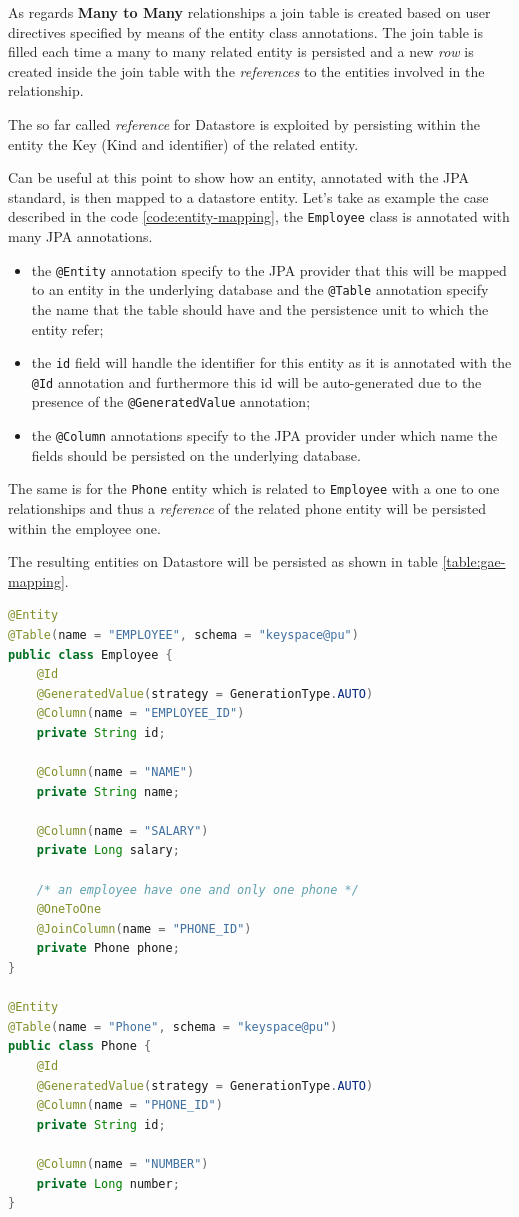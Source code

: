 \noindent As regards \textbf{Many to Many} relationships a join table is created based on user directives specified by means of the entity class annotations. The join table is filled each time a many to many related entity is persisted and a new \textit{row} is created inside the join table with the \textit{references} to the entities involved in the relationship.

\noindent The so far called \textit{reference} for Datastore is exploited by persisting within the entity the Key (Kind and identifier) of the related entity.

\newparagraph Can be useful at this point to show how an entity, annotated with the JPA standard, is then mapped to a datastore entity. 
Let's take as example the case described in the code \ref{code:entity-mapping}, the \texttt{Employee} class is annotated with many JPA annotations.
\begin{itemize}
\item the \texttt{@Entity} annotation specify to the JPA provider that this will be mapped to an entity in the underlying database and the \texttt{@Table} annotation specify the name that the table should have and the persistence unit to which the entity refer;
\item the \texttt{id} field will handle the identifier for this entity as it is annotated with the \texttt{@Id} annotation and furthermore this id will be auto-generated due to the presence of the \texttt{@GeneratedValue} annotation;
\item the \texttt{@Column} annotations specify to the JPA provider under which name the fields should be persisted on the underlying database.
\end{itemize}
The same is for the \texttt{Phone} entity which is related to \texttt{Employee} with a one to one relationships and thus a \textit{reference} of the related phone entity will be persisted within the employee one.

\noindent The resulting entities on Datastore will be persisted as shown in table \ref{table:gae-mapping}.

\begin{lstlisting}[language=Java, caption=Example entities, label=code:entity-mapping]
@Entity
@Table(name = "EMPLOYEE", schema = "keyspace@pu")
public class Employee {
    @Id
    @GeneratedValue(strategy = GenerationType.AUTO)
    @Column(name = "EMPLOYEE_ID")
    private String id;

    @Column(name = "NAME")
    private String name;

    @Column(name = "SALARY")
    private Long salary;

    /* an employee have one and only one phone */
    @OneToOne
    @JoinColumn(name = "PHONE_ID")
    private Phone phone;
}

@Entity
@Table(name = "Phone", schema = "keyspace@pu")
public class Phone {
    @Id
    @GeneratedValue(strategy = GenerationType.AUTO)
    @Column(name = "PHONE_ID")
    private String id;

    @Column(name = "NUMBER")
    private Long number;
}
\end{lstlisting}

